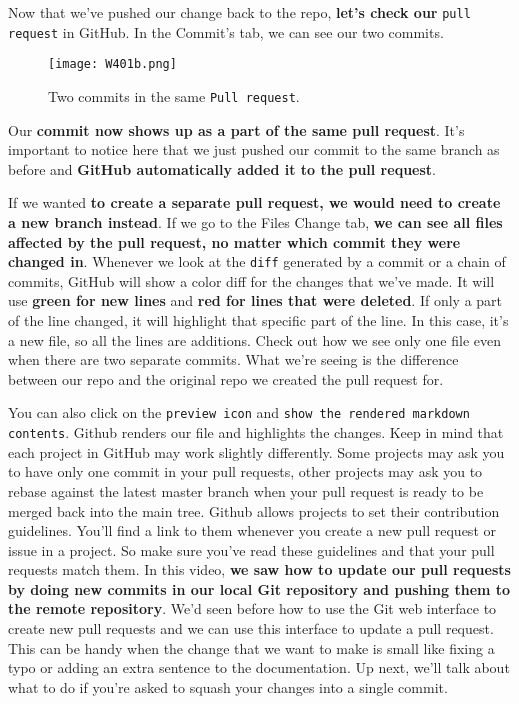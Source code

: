 	Now that we've pushed our change back to the repo, \textbf{let's check our} \texttt{pull request} in GitHub. In the Commit's tab, we can see our two commits.
	
	\begin{figure} 
		\caption{Two commits in the same \texttt{Pull request}.}
		\centering
		\texttt{[image: W401b.png]}
		\label{W401b}
	\end{figure}
	
	Our \textbf{commit now shows up as a part of the same pull request}. It's important to notice here that we just pushed our commit to the same branch as before and \textbf{GitHub automatically added it to the pull request}. 
	
	If we wanted\textbf{ to create a separate pull request, we would need to create a new branch instead}. If we go to the Files Change tab, \textbf{we can see all files affected by the pull request, no matter which commit they were changed in}. Whenever we look at the \verb|diff| generated by a commit or a chain of commits, GitHub will show a color diff for the changes that we've made. It will use \textbf{green for new lines} and \textbf{red for lines that were deleted}. If only a part of the line changed, it will highlight that specific part of the line. In this case, it's a new file, so all the lines are additions. Check out how we see only one file even when there are two separate commits. What we're seeing is the difference between our repo and the original repo we created the pull request for. 
	
	You can also click on the \texttt{preview icon} and \texttt{show the rendered markdown contents}. Github renders our file and highlights the changes. Keep in mind that each project in GitHub may work slightly differently. Some projects may ask you to have only one commit in your pull requests, other projects may ask you to rebase against the latest master branch when your pull request is ready to be merged back into the main tree. Github allows projects to set their contribution guidelines. You'll find a link to them whenever you create a new pull request or issue in a project. So make sure you've read these guidelines and that your pull requests match them. In this video, \textbf{we saw how to update our pull requests by doing new commits in our local Git repository and pushing them to the remote repository}. We'd seen before how to use the Git web interface to create new pull requests and we can use this interface to update a pull request. This can be handy when the change that we want to make is small like fixing a typo or adding an extra sentence to the documentation. Up next, we'll talk about what to do if you're asked to squash your changes into a single commit.
	
